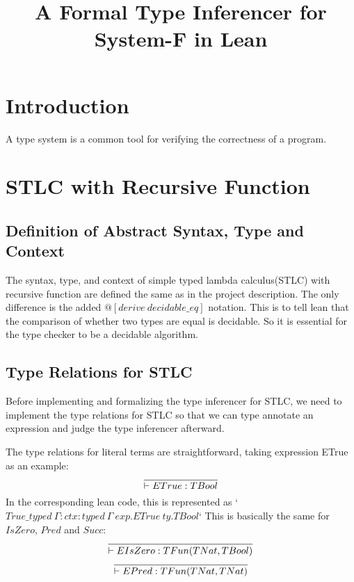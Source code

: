 \documentclass[conference]{IEEEtran}
\begin{document}
\title{A Formal Type Inferencer for System-F in Lean}
\author{
}

\maketitle

\begin{abstract}

\end{abstract}
\section{Introduction}
A type system is a common tool for verifying the correctness of a program.

\section{STLC with Recursive Function}
\subsection{Definition of Abstract Syntax, Type and Context}
The syntax, type, and context of simple typed lambda calculus(STLC) with recursive function are defined
the same as in the project description. The only difference is the added $@[derive\ decidable\_eq]$
notation. This is to tell lean that the comparison of whether two types are equal is decidable.
So it is essential for the type checker to be a decidable algorithm.

\subsection{Type Relations for STLC}
Before implementing and formalizing the type inferencer for STLC,
we need to implement the type relations for STLC so that we can
type annotate an expression and judge the type inferencer afterward.

The type relations for literal terms are straightforward, taking
expression ETrue as an example:
\begin{equation}
	\infer{\vdash ETrue:TBool}{}
	\label{eq:TITrue}
\end{equation}
In the corresponding lean code, this is represented as
`$True\_typed\ {\Gamma : ctx} : typed\ \Gamma\ exp.ETrue\ ty.TBool$`
This is basically the same for $IsZero$, $Pred$ and $Succ$:
\begin{equation}
	\infer{\vdash EIsZero:TFun(TNat, TBool)}{}
	\label{eq:TIIsZero}
\end{equation}
\begin{equation}
	\infer{\vdash EPred:TFun(TNat, TNat)}{}
	\label{eq:TIPred}
\end{equation}
\end{document}
